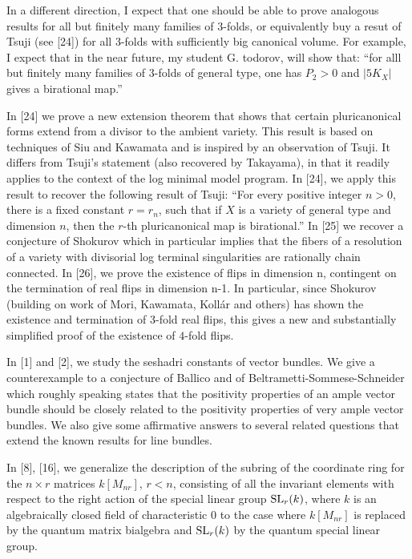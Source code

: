 \documentclass[12pt] {amsart}
\begin{document}
In a different direction, I expect that one should be able to prove analogous results for all but finitely many families of $3$-folds, or equivalently buy a resut of Tsuji (see [24]) for all $3$-folds with sufficiently big canonical volume. For example, I expect that in the near future, my student G. todorov, will show that: ``for alll but finitely many families of $3$-folds of general type, one has $P_2>0$ and $|5K_X|$ gives a birational map.''

\bigskip
{}

In [24] we prove a new extension theorem that shows that certain pluricanonical forms extend from a divisor to the ambient variety. This result is based on techniques of Siu and Kawamata and is inspired by an observation of Tsuji.
It differs from Tsuji's statement (also recovered by Takayama), in that it readily applies to the context of the log minimal model program.
In [24], we apply this result to recover the following result of Tsuji:
``For every positive integer $n>0$, there is a fixed constant $r=r_n$, such that if $X$ is a variety of general type and dimension $n$, then the $r$-th pluricanonical map is birational.''
In [25] we recover a conjecture of Shokurov which in particular implies that the fibers of a resolution of a variety with divisorial log terminal singularities are rationally chain connected.
In [26], we prove the existence of flips in dimension n, contingent on the termination of real flips in dimension n-1. In particular, since Shokurov (building on work of Mori, Kawamata, Koll\'ar and others) has shown the existence and termination of $3$-fold real flips, this gives a new and substantially simplified proof of the existence of $4$-fold flips.

\bigskip
{}
In [1] and [2], we study the seshadri constants of vector bundles. We give a counterexample to a conjecture of Ballico and of Beltrametti-Sommese-Schneider which roughly speaking states that the positivity properties of an ample vector bundle should be closely related to the positivity properties of very ample vector bundles. We also give some affirmative answers to several related questions that extend the known results for line bundles.

In [8], [16], we generalize the description of the subring of the coordinate ring for the $n \times r$ matrices $k [ M_{nr}]$, $r < n$, consisting of all the invariant elements with respect to the right action of the special linear group ${\rm SL}_r(k)$, where $k$ is an algebraically closed field of characteristic $0$ to the case where $k [ M_{nr}]$ is replaced by the quantum matrix bialgebra and ${\rm SL}_r(k)$ by the quantum special linear group.
\end{document}
